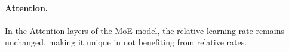 \documentclass{article}
\theoremstyle{plain}
\theoremstyle{definition}
\theoremstyle{remark}
\newcommand{\jl}[1]{\textcolor{green}{[JL: #1]}}
\begin{document}
    
    
    
    
    \paragraph{Attention.} In the Attention layers of the MoE model, the relative learning rate remains unchanged, making it unique in not benefiting from relative rates.
    
    
\end{document}

